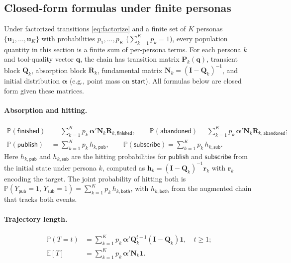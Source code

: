 \subsection{Closed-form formulas under finite personas}
\label{sec:method:finite-personas}
Under factorized transitions \eqref{eq:factorize} and a finite set of $K$ personas $\{\mathbf{u}_1, \ldots, \mathbf{u}_K\}$ with probabilities $p_1, \ldots, p_K$ ($\sum_{k=1}^K p_k = 1$), every population quantity in this section is a finite sum of per-persona terms. For each persona $k$ and tool-quality vector $\mathbf{q}$, the chain has transition matrix $\mathbf{P}_k(\mathbf{q})$, transient block $\mathbf{Q}_k$, absorption block $\mathbf{R}_k$, fundamental matrix $\mathbf{N}_k = (\mathbf{I} - \mathbf{Q}_k)^{-1}$, and initial distribution $\boldsymbol{\alpha}$ (e.g., point mass on $\mathsf{start}$). All formulas below are closed form given these matrices.

\paragraph{Absorption and hitting.}
\begin{align}
  \mathbb{P}(\mathsf{finished}) &= \sum_{k=1}^K p_k\, \boldsymbol{\alpha}' \mathbf{N}_k \mathbf{R}_{k,\mathsf{finished}}, \qquad
  \mathbb{P}(\mathsf{abandoned}) = \sum_{k=1}^K p_k\, \boldsymbol{\alpha}' \mathbf{N}_k \mathbf{R}_{k,\mathsf{abandoned}}; \label{eq:fp-absorb} \\
  \mathbb{P}(\mathsf{publish}) &= \sum_{k=1}^K p_k\, h_{k,\mathsf{pub}}, \qquad
  \mathbb{P}(\mathsf{subscribe}) = \sum_{k=1}^K p_k\, h_{k,\mathsf{sub}}. \label{eq:fp-hit}
\end{align}
Here $h_{k,\mathsf{pub}}$ and $h_{k,\mathsf{sub}}$ are the hitting probabilities for $\mathsf{publish}$ and $\mathsf{subscribe}$ from the initial state under persona $k$, computed as $\mathbf{h}_k = (\mathbf{I} - \mathbf{Q}_k)^{-1} \mathbf{r}_k$ with $\mathbf{r}_k$ encoding the target. The joint probability of hitting both is $\mathbb{P}(Y_{\mathsf{pub}} = 1,\, Y_{\mathsf{sub}} = 1) = \sum_{k=1}^K p_k\, h_{k,\mathsf{both}}$, with $h_{k,\mathsf{both}}$ from the augmented chain that tracks both events.

\paragraph{Trajectory length.}
\begin{align}
  \mathbb{P}(T = t) &= \sum_{k=1}^K p_k\, \boldsymbol{\alpha}' \mathbf{Q}_k^{t-1} (\mathbf{I} - \mathbf{Q}_k) \mathbf{1}, \quad t \geq 1; \label{eq:fp-length-dist} \\
  \mathbb{E}[T] &= \sum_{k=1}^K p_k\, \boldsymbol{\alpha}' \mathbf{N}_k \mathbf{1}. \label{eq:fp-length-mean}
\end{align}

